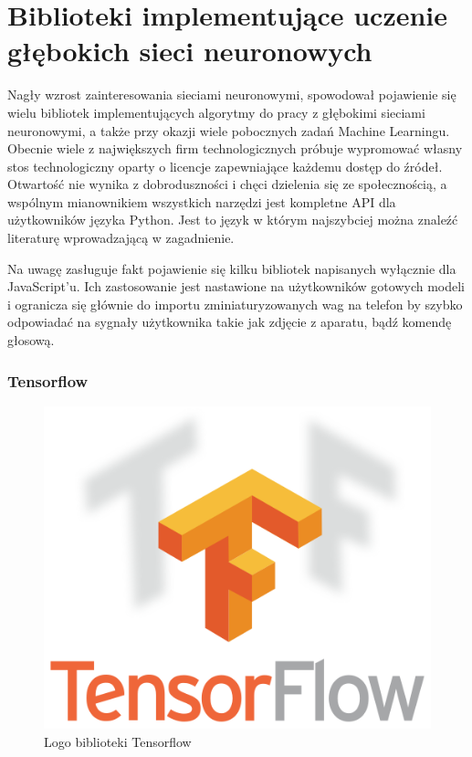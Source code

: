 \documentclass[12pt,a4paper,twoside,titlepage,openright]{book}
\begin{document}
\chapter{Biblioteki implementujące uczenie głębokich sieci neuronowych}
Nagły wzrost zainteresowania sieciami neuronowymi, spowodował pojawienie się wielu bibliotek implementujących algorytmy do pracy z głębokimi sieciami neuronowymi, a także przy okazji wiele pobocznych zadań Machine Learningu. Obecnie wiele z największych firm technologicznych próbuje wypromować własny stos technologiczny oparty o licencje zapewniające każdemu dostęp do źródeł. Otwartość nie wynika z dobroduszności i chęci dzielenia się ze społecznością, a wspólnym mianownikiem wszystkich narzędzi jest kompletne API dla użytkowników języka Python. Jest to język w którym najszybciej można znaleźć literaturę wprowadzającą w zagadnienie. \cite{siteDLByLanguage}

Na uwagę zasługuje fakt pojawienie się kilku bibliotek napisanych wyłącznie dla JavaScript'u. Ich zastosowanie jest nastawione na użytkowników gotowych modeli i ogranicza się głównie do importu zminiaturyzowanych wag na telefon by szybko odpowiadać na sygnały użytkownika takie jak zdjęcie z aparatu, bądź komendę głosową. 

\subsection{Tensorflow}
\begin{figure}[ht]
	\centering
			\includegraphics[resolution=100, scale=0.6]{Tensorflow.png}
		\caption{Logo biblioteki Tensorflow}
\end{figure}
\end{document}
